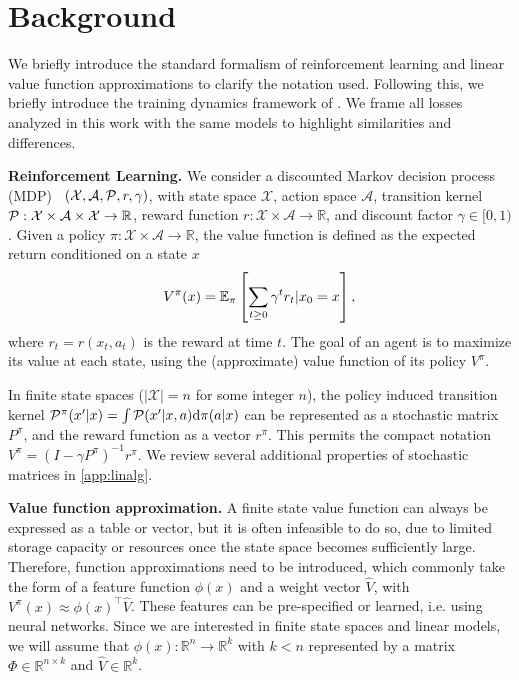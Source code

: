 \section{Background}
We briefly introduce the standard formalism of reinforcement learning and linear value function approximations to clarify the notation used.
Following this, we briefly introduce the training dynamics framework of \textcite{tang2022understanding,lelan2023bootstrapped}. 
We frame all losses analyzed in this work with the same models to highlight similarities and differences.

\textbf{Reinforcement Learning.} We consider a discounted Markov decision process (MDP)~\parencite{Puterman1994MarkovDP,suttonbook} $(\mathcal{X}, \mathcal{A}, {\mathcal{P}}, r, \gamma)$, with state space $\mathcal{X}$, action space $\mathcal{A}$, transition kernel ${\mathcal{P}}:\mathcal{X} \times \mathcal{A} \times \mathcal{X} \to \mathbb{R}$,
reward function $r: \mathcal{X} \times \mathcal{A} \to \mathbb{R}$, and discount factor $\gamma \in [0,1)$. Given a policy $\pi:\mathcal{X}\times \mathcal{A} \to \mathbb{R}$, the value function is defined as the expected return conditioned on a state $x$ $$V^\pi(x) = \mathbb{E}_{\pi}\left[  \sum_{t \geq 0} \gamma^t r_t|x_0 = x \right],$$ where $r_t = r(x_t, a_t)$ is the reward at time $t$. The goal of an agent is to maximize its value at each state, using the (approximate) value function of its policy $V^\pi$.



In finite state spaces ($\lvert\mathcal{X}\rvert = n$ for some integer $n$), the policy induced transition kernel ${\mathcal{P}}^\pi(x'|x) = \int \mathcal{P}(x'|x,a) \mathrm{d}\pi(a|x)$ can be represented as a stochastic matrix $P^\pi$, and the reward function as a vector $r^\pi$.
This permits the compact notation $V^\pi =(I - \gamma P^\pi)^{-1} r^\pi$.
We review several additional properties of stochastic matrices in \autoref{app:linalg}.

\textbf{Value function approximation.} A finite state value function can always be expressed as a table or vector, but it is often infeasible to do so, due to limited storage capacity or resources once the state space becomes sufficiently large.
Therefore, function approximations need to be introduced, which commonly take the form of a feature function $\phi(x)$ and a weight vector $\hat{V}$, with $V^\pi(x) \approx \phi(x)^\top \hat{V}$.
These features can be pre-specified or learned, i.e. using neural networks.
Since we are interested in finite state spaces and linear models, we will assume that $\phi(x): \mathbb{R}^{n} \rightarrow \mathbb{R}^{k}$ with $k < n$  represented by a matrix $\Phi \in \mathbb{R}^{n\times k}$ and $\hat{V} \in \mathbb{R}^k$.

